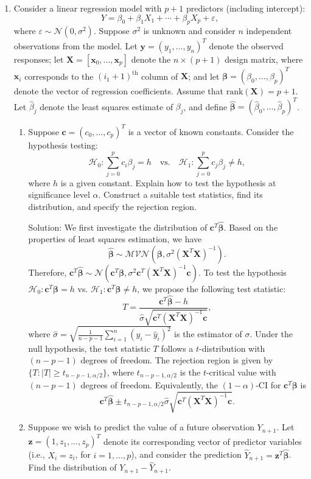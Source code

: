 \documentclass[12pt]{article}
\def\mx{\mathbf{x}}
\def\my{\mathbf{y}}
\def\mz{\mathbf{z}}
\def\mc{\mathbf{c}}
\def\mX{\mathbf{X}}
\def\bbeta{{\boldsymbol{\beta}}}
\def\estbeta{{\boldsymbol{\hat \beta}}}
\begin{document}
\begin{enumerate}
\setcounter{enumi}{0}

\item Consider a linear regression model with $p+1$ predictors (including intercept):
\[
Y=\beta_0+\beta_1X_1+\cdots+\beta_{p}X_{p}+\varepsilon,
\]
where $\varepsilon\sim \mathcal{N}(0,\sigma^2)$. Suppose $\sigma^2$ is unknown and consider $n$ independent observations from the model. Let $\my=(y_1,\ldots,y_n)^T$ denote the observed responses; let $\mX=[\mx_0,\ldots,\mx_p]$ denote the $n\times (p+1)$ design matrix, where $\mx_i$ corresponds to the $(i_1+1)^{\text{th}}$ column of $\mX$; and let $\bbeta=(\beta_0,\ldots,\beta_p)^T$ denote the vector of regression coefficients. Assume that $\text{rank}(\mX)=p+1$. Let $\hat \beta_j$ denote the least squares estimate of $\beta_j$, and define $\estbeta=(\hat \beta_0,\ldots,\hat \beta_{p})^T$.

\begin{enumerate}
\item Suppose $\mc=(c_0,\ldots,c_p)^T$ is a vector of known constants. Consider the hypothesis testing:
\[
\mathcal{H}_0:\sum_{j=0}^p c_i \beta_j=h\quad \text{vs.}\quad \mathcal{H}_1: \sum_{j=0}^p c_j \beta_j\neq h,
\]
where $h$ is a given constant. Explain how to test the hypothesis at significance level $\alpha$. Construct a suitable test statistics, find its distribution, and specify the rejection region.

{\color{red}Solution: We first investigate the distribution of $\mc^T\estbeta$. Based on the properties of least squares estimation, we have
\begin{equation}\label{eq:beta}
\estbeta \sim \mathcal{MVN}\left(\bbeta, \sigma^2\left(\mX^T\mX\right)^{-1}\right).
\end{equation}
Therefore, $\mc^T\estbeta\sim \mathcal{N}(\mc^T\bbeta, \sigma^2\mc^T \left(\mX^T\mX\right)^{-1}\mc)$. To test the hypothesis $\mathcal{H}_0\colon \mc^T\bbeta=h$ vs. $\mathcal{H}_1 \colon \mc^T\bbeta\neq h$, we propose the following test statistic:
\[
T=\frac{\mc^T\estbeta  - h} {\hat \sigma\sqrt{\mc^T \left(\mX^T\mX\right)^{-1}\mc}},
\]
where $\hat \sigma = \sqrt{\frac{1}{n-p-1}\sum_{i=1}^n(y_i-\hat y_i)^2}$ is the estimator of $\sigma$. Under the null hypothesis, the test statistic $T$ follows a $t$-distribution with $(n-p-1)$ degrees of freedom. The rejection region is given by $ \{ T: |T|\geq t_{n-p-1, \alpha/2}\}$,
where $t_{n-p-1,\alpha/2}$ is the $t$-critical value with $(n-p-1)$ degrees of freedom. Equivalently, the $(1-\alpha)$-CI for $\mc^T\bbeta$ is 
\[
\mc^T\estbeta\pm t_{n-p-1,\alpha/2} \hat \sigma \sqrt{\mc^T \left(\mX^T\mX\right)^{-1}\mc}.
\]
}
\item Suppose we wish to predict the value of a future observation $Y_{n+1}$. Let $\mz=(1,z_1,\ldots,z_p)^T$ denote its corresponding vector of predictor variables (i.e., $X_i=z_i$, for $i=1,\ldots,p$), and consider the prediction $\hat Y_{n+1}=\mz^T\estbeta$. Find the distribution of $Y_{n+1}-\hat Y_{n+1}$. 


\end{enumerate}
\end{enumerate}
\end{document}
